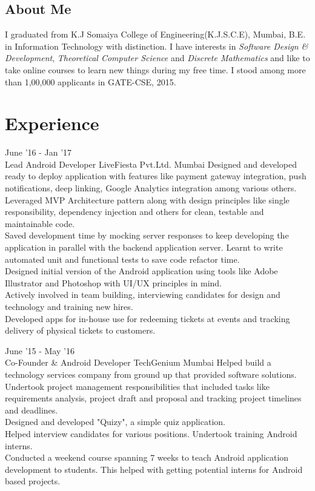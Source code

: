 \documentclass[10pt, a4paper, sans]{moderncv}
\title{}
\begin{document}
\makecvtitle

\subsection{\hfil About Me \hfil}
I graduated from K.J Somaiya College of Engineering(K.J.S.C.E), Mumbai, B.E. in Information Technology with distinction. I have interests in \emph{Software Design \& Development}, \emph{Theoretical Computer Science} and \emph{Discrete Mathematics} and like to take online courses to learn new things during my free time. I stood  among more than 1,00,000 applicants in GATE-CSE, 2015.

\section{Experience}
\cventry
{June '16 - Jan '17 \\ {\faAndroid} {\faUsers}}
{Lead Android Developer}
{LiveFiesta Pvt.Ltd.}
{Mumbai}
{}
{
{\faCaretRight} Designed and developed ready to deploy application with features like payment gateway integration, push notifications, deep linking, Google Analytics integration among various others. \\
{\faCaretRight} Leveraged MVP Architecture pattern along with design principles like single responsibility, dependency injection and others for clean, testable and maintainable code. \\
{\faCaretRight} Saved development time by mocking server responses to keep developing the application in parallel with the backend application server. Learnt to write automated unit and functional tests to save code refactor time. \\
{\faCaretRight} Designed initial version of the Android application using tools like Adobe Illustrator and Photoshop with UI/UX principles in mind. \\
{\faCaretRight} Actively involved in team building, interviewing candidates for design and technology and training new hires.\\
{\faCaretRight} Developed apps for in-house use for redeeming tickets at events and tracking delivery of physical tickets to customers.
}

\cventry
{June '15 - May '16 \\ {\faAndroid} {\faBriefcase}}
{Co-Founder \& Android Developer}
{TechGenium}
{Mumbai}
{}
{
{\faCaretRight} Helped build a technology services company from ground up that provided software solutions. \\
{\faCaretRight} Undertook project management responsibilities that included tasks like requirements analysis, project draft and proposal and tracking project timelines and deadlines. \\
{\faCaretRight} Designed and developed "Quizy", a simple quiz application. \\
{\faCaretRight} Helped interview candidates for various positions. Undertook training Android interns. \\
{\faCaretRight} Conducted a weekend course spanning 7 weeks to teach Android application development to students. This helped with getting potential interns for Android based projects.
}
\end{document}
